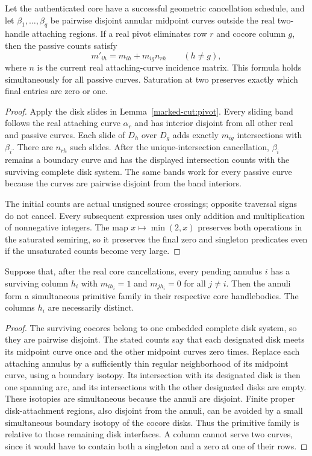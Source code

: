 \begin{proposition}
\label{marked-cut:passive-pivot}
Let the authenticated core have a successful geometric cancellation schedule,
and let $\beta_1,\ldots,\beta_q$ be pairwise disjoint annular midpoint curves
outside the real two-handle attaching regions. If a real pivot eliminates
row $r$ and cocore column $g$, then the passive counts satisfy
\[
 m'_{ih}=m_{ih}+m_{ig}n_{rh}\qquad(h\ne g),
\]
where $n$ is the current real attaching-curve incidence matrix. This formula
holds simultaneously for all passive curves. Saturation at two preserves
exactly which final entries are zero or one.
\end{proposition}
\begin{proof}
Apply the disk slides in Lemma~\ref{marked-cut:pivot}. Every sliding band
follows the real attaching curve $\alpha_r$ and has interior disjoint from
all other real and passive curves. Each slide of $D_h$ over $D_g$ adds
exactly $m_{ig}$ intersections with $\beta_i$. There are $n_{rh}$ such
slides. After the unique-intersection cancellation, $\beta_i$ remains a
boundary curve and has the displayed intersection counts with the surviving
complete disk system. The same bands work for every passive curve because
the curves are pairwise disjoint from the band interiors.

The initial counts are actual unsigned source crossings; opposite traversal
signs do not cancel. Every subsequent expression uses only addition and
multiplication of nonnegative integers. The map $x\mapsto\min(2,x)$ preserves
both operations in the saturated semiring, so it preserves the final zero
and singleton predicates even if the unsaturated counts become very large.
\end{proof}

\begin{proposition}
\label{marked-cut:core-private-family}
Suppose that, after the real core cancellations, every pending annulus $i$
has a surviving column $h_i$ with $m_{i h_i}=1$ and $m_{j h_i}=0$ for all
$j\ne i$. Then the annuli form a simultaneous primitive family in their
respective core handlebodies. The columns $h_i$ are necessarily distinct.
\end{proposition}
\begin{proof}
The surviving cocores belong to one embedded complete disk system, so they
are pairwise disjoint. The stated counts say that each designated disk meets
its midpoint curve once and the other midpoint curves zero times. Replace
each attaching annulus by a sufficiently thin regular neighborhood of its
midpoint curve, using a boundary isotopy. Its intersection with its designated
disk is then one spanning arc, and its intersections with the other designated
disks are empty. These isotopies are simultaneous because the annuli are
disjoint. Finite proper disk-attachment regions, also disjoint from the annuli,
can be avoided by a small simultaneous boundary isotopy of the cocore disks.
Thus the primitive family is relative to those remaining disk interfaces.
A column cannot serve two curves, since it would have to contain both a
singleton and a zero at one of their rows.
\end{proof}


